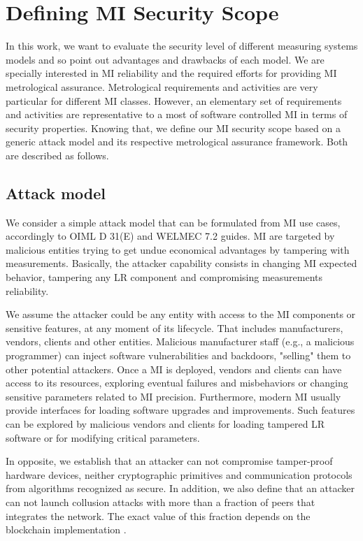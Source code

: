 \documentclass[journal]{IEEEtran}
\begin{document}
\section{Defining MI Security Scope}
In this work, we want to evaluate the security level of different measuring systems models and so point out advantages and drawbacks of each model. We are specially interested in MI reliability and the required efforts for providing MI metrological assurance. Metrological requirements and activities are very particular for different MI classes. However, an elementary set of requirements and activities are representative to a most of software controlled MI in terms of security properties. Knowing that, we define our MI security scope based on a generic attack model and its respective metrological assurance framework. Both are described as follows. %

\subsection{Attack model}
We consider a simple attack model that can be formulated from MI use cases, accordingly to OIML D 31(E) and WELMEC 7.2 guides. MI are targeted by malicious entities trying to get undue economical advantages by tampering with measurements. Basically, the attacker capability consists in changing MI expected behavior, tampering any LR component and compromising measurements reliability. 

We assume the attacker could be any entity with access to the MI components or sensitive features, at any moment of its lifecycle. 
That includes manufacturers, vendors, clients and other entities. Malicious manufacturer staff (e.g., a malicious programmer) can inject software vulnerabilities and backdoors, "selling" them to other potential attackers. 
Once a MI is deployed, vendors and clients can have access to its resources, exploring eventual failures and misbehaviors or changing sensitive parameters related to MI precision. 
Furthermore, modern MI usually provide interfaces for loading software upgrades and improvements.
Such features can be explored by malicious vendors and clients for loading tampered LR software or for modifying critical parameters.

In opposite, we establish that an attacker can not compromise tamper-proof hardware devices, neither cryptographic primitives and communication protocols from algorithms recognized as secure. In addition, we also define that an attacker can not launch collusion attacks with more than a fraction of peers that integrates the network. The exact value of this fraction depends on the blockchain implementation \cite{Vukolic2016}. %
\end{document}
